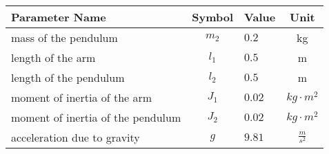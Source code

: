 \begin{tabular}{lclc}
\hline
 Parameter Name                    &  Symbol  & Value   &      Unit       \\
\hline
 mass of the pendulum              & $m_{2}$  & $0.2$   &       kg        \\
 length of the arm                 & $l_{1}$  & $0.5$   &        m        \\
 length of the pendulum            & $l_{2}$  & $0.5$   &        m        \\
 moment of inertia of the arm      & $J_{1}$  & $0.02$  & $kg \cdot m^2$  \\
 moment of inertia of the pendulum & $J_{2}$  & $0.02$  & $kg \cdot m^2$  \\
 acceleration due to gravity       &   $g$    & $9.81$  & $\frac{m}{s^2}$ \\
\hline
\end{tabular}